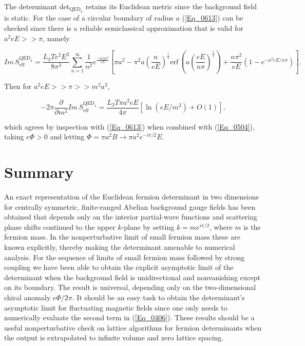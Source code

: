 \documentclass[a4paper,twocolumn,showpacs,preprintnumbers,amsmath,amssymb]{revtex4}
\newcommand{\half}{\frac{1}{2}}
\newcommand{\gap}{\vspace{3mm}}
\newcommand{\pdo}[1]{\ensuremath{\frac{\partial }
        {\partial #1 }}}
\begin{document}
\noindent
The determinant det$_{\text{QED}_2}$ retains its Euclidean metric
since the background field is static. For the case of a circular
boundary of radius $a$ (\ref{Eq_0613}) can be checked since there is a
reliable semiclassical approximation that is valid for $a^2eE >> \pi$,
namely~\cite{Martin88}

\begin{widetext}
\begin{equation}
\label{Eq_0614}
Im \, S^{\text{QED}_4}_{\text{eff}}
  = \frac{L_3 T e^2 E^2}{8 \pi^3}
  \sum^{\infty}_{n=1} \frac{1}{n^2} e^{\textstyle{\frac{-n\pi m^2}{eE}}}
  \left[
  \pi a^2 - \pi^2 a \left(\frac{n}{eE}\right)^{\half}
  \text{erf} \, \left(a\left(\frac{eE}{n\pi}\right)^{\half}\right)
  + \frac{n\pi^2}{eE} (1 - e^{-a^2 e E / n\pi})
  \right].
\end{equation}
\end{widetext}

\noindent
Then for $a^2 e E >> \pi >> m^2 a^2$,

\begin{equation}
\label{Eq_0615}
-2\pi \pdo{m^2} Im \, S^{\text{QED}_4}_{\text{eff}}
  = \frac{L_3 T \pi a^2 e E}{4 \pi}[\ln(eE/m^2) + O(1)],
\end{equation}

\gap
\noindent
which agrees by inspection with (\ref{Eq_0613}) when combined with
(\ref{Eq_0504}), taking $e\Phi > 0$ and letting
$\Phi = \pi a^2 B \to \pi a^2 e^{-i\pi/2} E$.


\section{\label{Sec_SecVII}
Summary}

An exact representation of the Euclidean fermion determinant in two
dimensions for centrally symmetric, finite-ranged Abelian background
gauge fields has been obtained that depends only on the interior
partial-wave functions and scattering phase shifts continued to the
upper $k$-plane by setting $k = me^{i\pi/2}$, where $m$ is the fermion
mass. In the nonperturbative limit of small fermion mass these are
known explicitly, thereby making the determinant amenable to numerical
analysis. For the sequence of limits of small fermion mass followed by
strong coupling we have been able to obtain the explicit asymptotic
limit of the determinant when the background field is unidirectional
and nonvanishing except on its boundary. The result is universal,
depending only on the two-dimensional chiral anomaly $e\Phi/2\pi$. It
should be an easy task to obtain the determinant's asymptotic limit
for fluctuating magnetic fields since one only needs to numerically
evaluate the second term in (\ref{Eq_0406}). These results should be a
useful nonperturbative check on lattice algorithms for fermion
determinants when the output is extrapolated to infinite volume and
zero lattice spacing.
\end{document}
